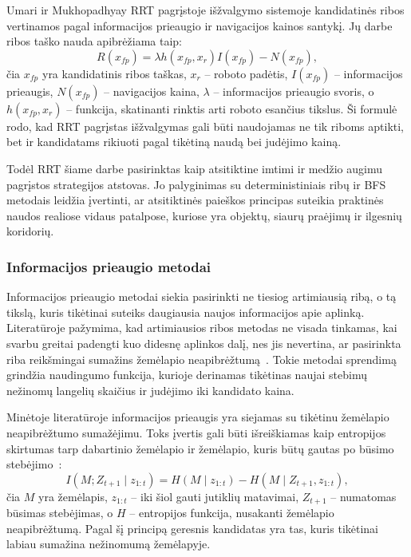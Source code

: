 \documentclass[]{VUMIFTemplateClass}
\begin{document}
Umari ir Mukhopadhyay RRT pagrįstoje išžvalgymo sistemoje kandidatinės ribos vertinamos pagal informacijos prieaugio ir navigacijos kainos santykį. Jų darbe
ribos taško nauda apibrėžiama taip:
\begin{equation}
    R(x_{fp}) = \lambda h(x_{fp}, x_r) I(x_{fp}) - N(x_{fp}),
    \label{eq:rrt-revenue}
\end{equation}
čia $x_{fp}$ yra kandidatinis ribos taškas, $x_r$ -- roboto padėtis, $I(x_{fp})$ -- informacijos prieaugis, $N(x_{fp})$ -- navigacijos kaina, $\lambda$ --
informacijos prieaugio svoris, o $h(x_{fp}, x_r)$ -- funkcija, skatinanti rinktis arti roboto esančius tikslus. Ši formulė rodo, kad RRT pagrįstas
išžvalgymas gali būti naudojamas ne tik riboms aptikti, bet ir kandidatams rikiuoti pagal tikėtiną naudą bei judėjimo kainą.

Todėl RRT šiame darbe pasirinktas kaip atsitiktine imtimi ir medžio augimu pagrįstos strategijos atstovas. Jo palyginimas su deterministiniais ribų ir BFS metodais leidžia
įvertinti, ar atsitiktinės paieškos principas suteikia praktinės naudos realiose vidaus patalpose, kuriose yra objektų, siaurų praėjimų ir ilgesnių koridorių.

\subsubsection{Informacijos prieaugio metodai}                                                                                                                 
                
Informacijos prieaugio metodai siekia pasirinkti ne tiesiog artimiausią ribą, o tą tikslą, kuris tikėtinai suteiks daugiausia naujos informacijos apie aplinką.
Literatūroje pažymima, kad artimiausios ribos metodas ne visada tinkamas, kai svarbu greitai padengti kuo didesnę aplinkos dalį, nes jis nevertina, ar
pasirinkta riba reikšmingai sumažins žemėlapio neapibrėžtumą~\cite{pimentel2016infogain}. Tokie metodai sprendimą grindžia naudingumo funkcija, kurioje        
derinamas tikėtinas naujai stebimų nežinomų langelių skaičius ir judėjimo iki kandidato kaina.                                                                 
                                                                                                                                                                
Minėtoje literatūroje informacijos prieaugis yra siejamas su tikėtinu žemėlapio neapibrėžtumo sumažėjimu. Toks įvertis gali būti išreiškiamas kaip entropijos skirtumas tarp
dabartinio žemėlapio ir žemėlapio, kuris būtų gautas po būsimo stebėjimo~\cite{pimentel2016infogain}:
\begin{equation}
    I(M; Z_{t+1} \mid z_{1:t}) =
    H(M \mid z_{1:t}) - H(M \mid Z_{t+1}, z_{1:t}),
    \label{eq:information-gain-entropy}
\end{equation}
čia $M$ yra žemėlapis, $z_{1:t}$ -- iki šiol gauti jutiklių matavimai, $Z_{t+1}$ -- numatomas būsimas stebėjimas, o $H$ -- entropijos funkcija, nusakanti
žemėlapio neapibrėžtumą. Pagal šį principą geresnis kandidatas yra
tas, kuris tikėtinai labiau sumažina nežinomumą žemėlapyje.
\end{document}
